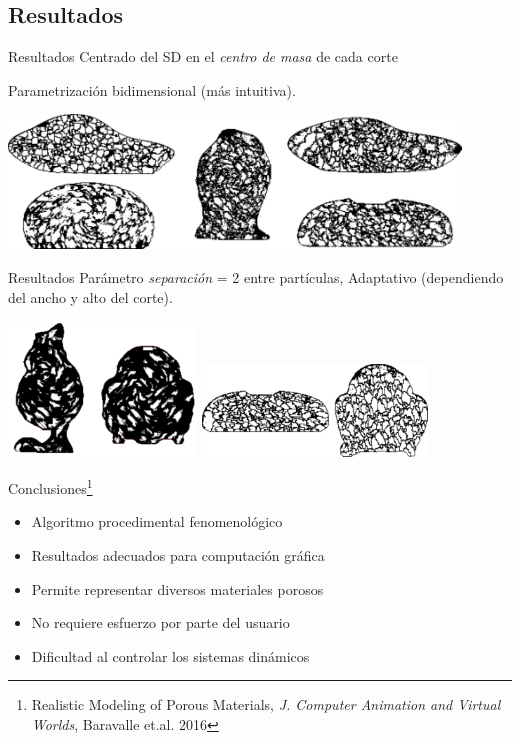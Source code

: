 \documentclass[spanish,unknownkeysallowed,10pt]{beamer}
\begin{document}
\subsection{Resultados}

\begin{frame}{Resultados}
Centrado del SD en el {\em centro de masa} de cada corte

Parametrización bidimensional (más intuitiva).

\includegraphics[width=12cm]{../figures/Fig5}
\end{frame}


\begin{frame}{Resultados}
Parámetro {\em separación} = 2 entre partículas, Adaptativo (dependiendo del ancho y alto del corte).

\includegraphics[width=5cm]{../figures/Fig7}
\includegraphics[width=6cm]{../figures/Fig6}





\end{frame}


\begin{frame}{Conclusiones\footnote{Realistic Modeling of Porous Materials, {\it J. Computer Animation and Virtual Worlds}, Baravalle et.al. 2016}}
\begin{block}{}
\begin{itemize}
\item Algoritmo procedimental fenomenológico
\item Resultados adecuados para computación gráfica
\item Permite representar diversos materiales porosos
\item No requiere esfuerzo por parte del usuario

\item Dificultad al controlar los sistemas dinámicos
\end{itemize}
\end{block}
\end{frame}
\end{document}

